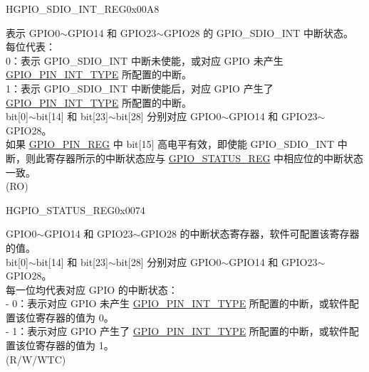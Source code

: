 \begin{register}{H}{GPIO\_SDIO\_INT\_REG}{0x00A8}\label{regdesc:GPIOSDIOINTREG}
%
\regnewline%
\begin{regdesc}\begin{reglist}
\label{fielddesc:GPIOSDIOINT}\item [GPIO\_SDIO\_INT] 表示 GPIO0$\sim$GPIO14 和 GPIO23$\sim$GPIO28 的 GPIO\_SDIO\_INT 中断状态。\\ 
每位代表：\\
0：表示 GPIO\_SDIO\_INT 中断未使能，或对应 GPIO 未产生 \hyperref[fielddesc:GPIOPINNINTTYPE]{GPIO\_PIN\_INT\_TYPE} 所配置的中断。\\
1：表示 GPIO\_SDIO\_INT 中断使能后，对应 GPIO 产生了 \hyperref[fielddesc:GPIOPINNINTTYPE]{GPIO\_PIN\_INT\_TYPE} 所配置的中断。\\
bit[0]$\sim$bit[14] 和 bit[23]$\sim$bit[28] 分别对应 GPIO0$\sim$GPIO14 和 GPIO23$\sim$GPIO28。\\
如果 \hyperref[regdesc:GPIOPINNREG]{GPIO\_PIN\_REG} 中 bit[15] 高电平有效，即使能 GPIO\_SDIO\_INT 中断，则此寄存器所示的中断状态应与 \hyperref[regdesc:GPIOSTATUSREG]{GPIO\_STATUS\_REG} 中相应位的中断状态一致。 \\ (RO)
\end{reglist}\end{regdesc}
\end{register}


\begin{register}{H}{GPIO\_STATUS\_REG}{0x0074}\label{regdesc:GPIOSTATUSREG}
%
\regnewline%
\begin{regdesc}\begin{reglist}
\label{fielddesc:GPIOSTATUSINTERRUPT}\item [GPIO\_STATUS\_INTERRUPT] GPIO0$\sim$GPIO14 和 GPIO23$\sim$GPIO28 的中断状态寄存器，软件可配置该寄存器的值。\\
bit[0]$\sim$bit[14] 和 bit[23]$\sim$bit[28] 分别对应 GPIO0$\sim$GPIO14 和 GPIO23$\sim$GPIO28。\\
每一位均代表对应 GPIO 的中断状态：\\
    - 0：表示对应 GPIO 未产生 \hyperref[fielddesc:GPIOPINNINTTYPE]{GPIO\_PIN\_INT\_TYPE} 所配置的中断，或软件配置该位寄存器的值为 0。\\
    - 1：表示对应 GPIO 产生了 \hyperref[fielddesc:GPIOPINNINTTYPE]{GPIO\_PIN\_INT\_TYPE} 所配置的中断，或软件配置该位寄存器的值为 1。\\
 (R/W/WTC)
\end{reglist}\end{regdesc}
\end{register}


